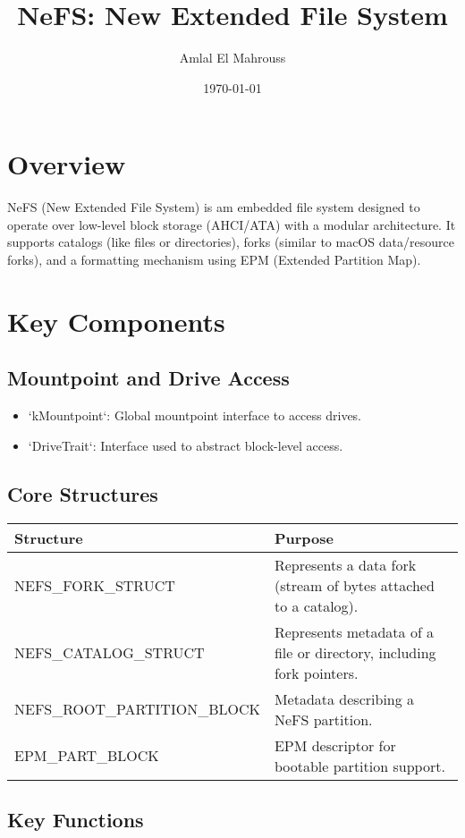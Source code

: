 \documentclass{article}
\title{NeFS: New Extended File System}
\author{Amlal El Mahrouss}
\date{\today}
\begin{document}
\maketitle

\section{Overview}
NeFS (New Extended File System) is am embedded file system designed to operate over low-level block storage (AHCI/ATA) with a modular architecture. It supports catalogs (like files or directories), forks (similar to macOS data/resource forks), and a formatting mechanism using EPM (Extended Partition Map).

\section{Key Components}

\subsection*{Mountpoint and Drive Access}
\begin{itemize}
  \item `kMountpoint`: Global mountpoint interface to access drives.
  \item `DriveTrait`: Interface used to abstract block-level access.
\end{itemize}

\subsection*{Core Structures}
\begin{longtable}{|l|p{11cm}|}
\hline
\textbf{Structure} & \textbf{Purpose} \\
\hline
NEFS\_FORK\_STRUCT & Represents a data fork (stream of bytes attached to a catalog). \\
\hline
NEFS\_CATALOG\_STRUCT & Represents metadata of a file or directory, including fork pointers. \\
\hline
NEFS\_ROOT\_PARTITION\_BLOCK & Metadata describing a NeFS partition. \\
\hline
EPM\_PART\_BLOCK & EPM descriptor for bootable partition support. \\
\hline
\end{longtable}

\subsection*{Key Functions}
\end{document}
